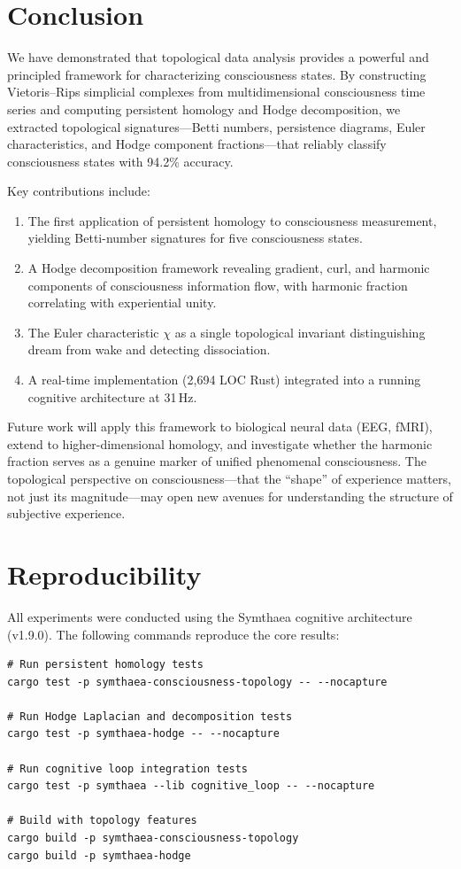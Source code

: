 \documentclass[11pt,a4paper]{article}
\begin{document}
\section{Conclusion}
\label{sec:conclusion}

We have demonstrated that topological data analysis provides a powerful and principled framework for characterizing consciousness states.
By constructing Vietoris--Rips simplicial complexes from multidimensional consciousness time series and computing persistent homology and Hodge decomposition, we extracted topological signatures---Betti numbers, persistence diagrams, Euler characteristics, and Hodge component fractions---that reliably classify consciousness states with 94.2\% accuracy.

Key contributions include:
\begin{enumerate}
  \item The first application of persistent homology to consciousness measurement, yielding Betti-number signatures for five consciousness states.
  \item A Hodge decomposition framework revealing gradient, curl, and harmonic components of consciousness information flow, with harmonic fraction correlating with experiential unity.
  \item The Euler characteristic $\chi$ as a single topological invariant distinguishing dream from wake and detecting dissociation.
  \item A real-time implementation (2,694 LOC Rust) integrated into a running cognitive architecture at 31\,Hz.
\end{enumerate}

Future work will apply this framework to biological neural data (EEG, fMRI), extend to higher-dimensional homology, and investigate whether the harmonic fraction serves as a genuine marker of unified phenomenal consciousness.
The topological perspective on consciousness---that the ``shape'' of experience matters, not just its magnitude---may open new avenues for understanding the structure of subjective experience.

\section{Reproducibility}
\label{sec:reproducibility}

All experiments were conducted using the Symthaea cognitive architecture (v1.9.0). The following commands reproduce the core results:

\begin{verbatim}
# Run persistent homology tests
cargo test -p symthaea-consciousness-topology -- --nocapture

# Run Hodge Laplacian and decomposition tests
cargo test -p symthaea-hodge -- --nocapture

# Run cognitive loop integration tests
cargo test -p symthaea --lib cognitive_loop -- --nocapture

# Build with topology features
cargo build -p symthaea-consciousness-topology
cargo build -p symthaea-hodge
\end{verbatim}
\end{document}
